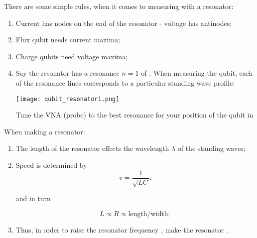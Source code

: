 There are some simple rules, when it comes to
measuring with a resonator:

\begin{framed}\noindent
  \begin{enumerate}
  \item Current  has nodes on the  end of the
    resonator - voltage has antinodes;
  \item Flux qubit needs current maxima;
  \item Charge qubits need voltage maxima;
  \item  Say the  resonator  has a  resonance
    $  n  =  1  $  of  .   When
    measuring   the   qubit,  each   of   the
    resonance   lines    corresponds   to   a
    particular standing wave profile:
    \begin{center}
      \texttt{[image: qubit\_resonator1.png]}
    \end{center}
    \noindent  Tune the  VNA  (probe) to  the
    best resonance  for your position  of the
    qubit       in      
  \end{enumerate}
\end{framed}

\begin{framed}\noindent
  When making a resonator:
  \begin{enumerate}
  \item The  length of the  resonator effects
    the wavelength $\lambda$  of the standing
    waves;

  \item Speed is determined by
    \begin{equation}
      \label{eq:resonator2}
      v = \frac{1}{\sqrt{LC}}.
    \end{equation}

    \noindent and in turn

    \begin{equation}
      \label{eq:resonator3}
      L      \propto  R \propto  \text{length}/\text{width};
    \end{equation}

  \item Thus, in order to raise the resonator
    frequency ,  make the resonator
    .
  \end{enumerate}
\end{framed}

